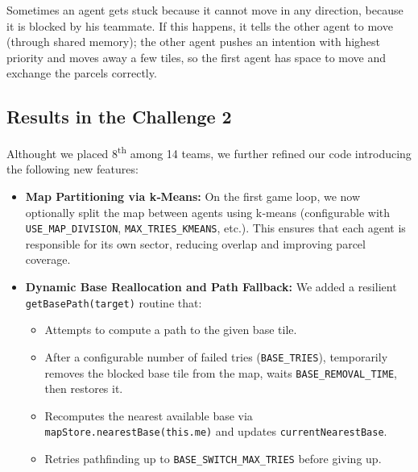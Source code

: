 Sometimes an agent gets stuck because it cannot move in any direction, because it is blocked by his teammate. If this happens, it tells the other agent to move (through shared memory); the other agent pushes an intention with highest priority and moves away a few tiles, so the first agent has space to move and exchange the parcels correctly.


\subsection{Results in the Challenge 2}



Althought we placed 8\textsuperscript{th} among 14 teams, we further refined our code introducing the following new features:

\begin{itemize}
  \item \textbf{Map Partitioning via k‐Means:}  
    On the first game loop, we now optionally split the map between agents using k‐means (configurable with \texttt{USE\_MAP\_DIVISION}, \texttt{MAX\_TRIES\_KMEANS}, etc.). This ensures that each agent is responsible for its own sector, reducing overlap and improving parcel coverage.

  \item \textbf{Dynamic Base Reallocation and Path Fallback:}  
    We added a resilient \texttt{getBasePath(target)} routine that:  
    \begin{itemize}
      \item Attempts to compute a path to the given base tile.
      \item After a configurable number of failed tries (\texttt{BASE\_TRIES}), temporarily removes the blocked base tile from the map, waits \texttt{BASE\_REMOVAL\_TIME}, then restores it.
      \item Recomputes the nearest available base via \texttt{mapStore.nearestBase(this.me)} and updates \texttt{currentNearestBase}.
      \item Retries pathfinding up to \texttt{BASE\_SWITCH\_MAX\_TRIES} before giving up.
    \end{itemize}
\end{itemize}


